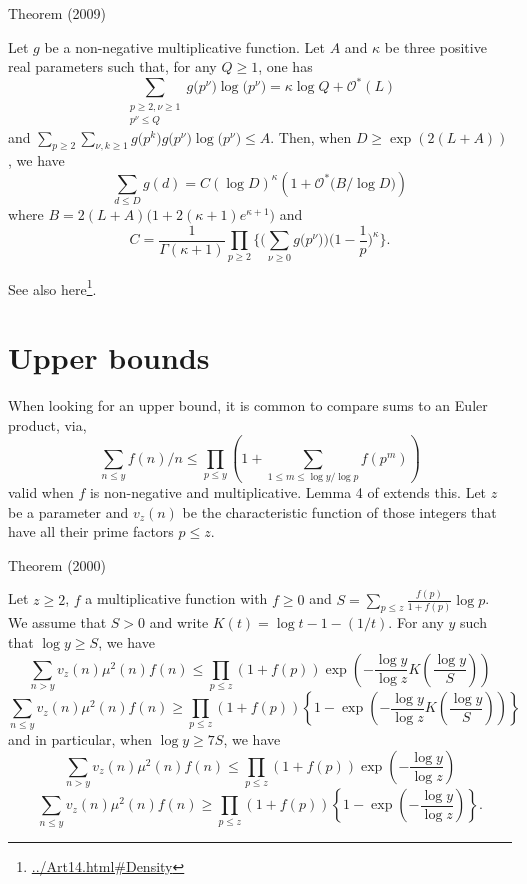 \par 
\begin{thm}{Theorem (2009)}

Let $g$ be a non-negative multiplicative function.
Let $A$ and $\kappa$ be three positive real parameters such that, for any
$Q\ge1$, one has
$$
\sum_{\substack{ p\ge2, \nu\ge1\\  p^{\nu}\le Q}}
g\bigl(p^{\nu}\bigr)\log\bigl(p^{\nu}\bigr)
=
\kappa\log Q+\mathcal{O}^*(L)
$$
and
$
\sum_{p\ge2}
\sum_{\nu,k\ge1}g\bigl(p^k\bigr)g\bigl(p^{\nu}\bigr)\log\bigl(p^{\nu}\bigr)
\le A.
$
Then, when $D\ge\exp(2(L+A))$, we have
$$
\sum_{d\le D}g(d)= C\left(\log D\right)^{\kappa}
\left(1+\mathcal{O}^*\bigl(B/\log D\bigr)\right)
$$
where $B=2(L+A)\bigl(1+2(\kappa+1)e^{\kappa+1}\bigr)$ and
$$
C=\frac{1}{\Gamma(\kappa+1)}
\prod_{p\ge2}\biggl\{
\biggl(\sum_{\nu\ge0}g\bigl(p^{\nu}\bigr)\biggr)
\biggl(1-\frac1p\biggr)^{\kappa}\biggr\}.
$$
\end{thm}

See also here\footnote{\url{../Art14.html#Density}}.

\section{Upper bounds}


When looking for an upper bound, it is common to compare sums to an Euler
product, via, 
$$
\sum_{n\le y}f(n)/n\le \prod_{p\le y}
\left(1+\sum_{1\le m\le \log y/\log p}f(p^m)\right)
$$
valid when $f$ is non-negative and multiplicative.
Lemma 4 of
\cite{Daboussi-Rivat*01}
extends this. Let $z$ be a parameter and $v_z(n)$ be the characteristic
function of those integers that have all their prime factors $p\le z$.

\begin{thm}{Theorem (2000)}

Let $z\ge2$, $f$ a multiplicative function with $f\ge0$ and 
$S=\sum_{p\le z}\frac{f(p)}{1+f(p)}\log p$. We assume that $S>0$ and write
$K(t)=\log t-1-(1/t)$. For any $y$ such that $\log y\ge S$, we have
$$
\sum_{n > y}v_z(n)\mu^2(n)f(n)
\le \prod_{p\le z}(1+f(p))\exp\left(-\frac{\log y}{\log z}
K\left(\frac{\log y}{S}\right)\right)
$$
$$
\sum_{n \le y}v_z(n)\mu^2(n)f(n)
\ge \prod_{p\le z}(1+f(p))\left\{1-\exp\left(-\frac{\log y}{\log z}
K\left(\frac{\log y}{S}\right)\right)\right\}
$$
and in particular, when $\log y\ge 7S$, we have
$$
\sum_{n > y}v_z(n)\mu^2(n)f(n)
\le \prod_{p\le z}(1+f(p))\exp\left(-\frac{\log y}{\log z}\right)
$$
$$
\sum_{n \le y}v_z(n)\mu^2(n)f(n)
\ge \prod_{p\le z}(1+f(p))\left\{1-\exp\left(-\frac{\log y}{\log z}\right)\right\}.
$$
\end{thm}


